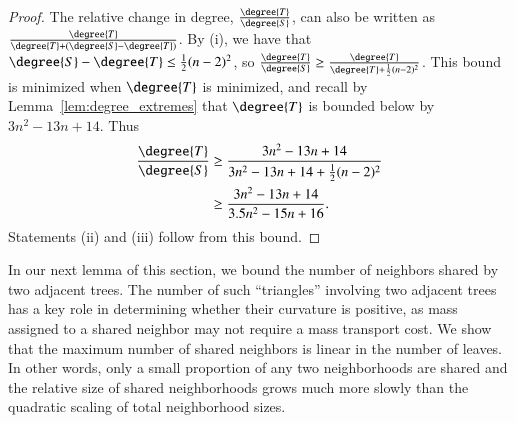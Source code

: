 \documentclass[]{elsarticle}
\begin{document}
\begin{proof}
The relative change in degree, $\frac{\degree{T}}{\degree{S}}$, can also be written as $\frac{\degree{T}}{\degree{T} + (\degree{S} - \degree{T})}$.
By (i), we have that $\degree{S} - \degree{T} \le \frac{1}{2} (n-2)^2$,
so $\frac{\degree{T}}{\degree{S}} \ge \frac{\degree{T}}{\degree{T} + \frac{1}{2} (n-2)^2} $.
This bound is minimized when $\degree{T}$ is minimized, and recall by Lemma~\ref{lem:degree_extremes} that $\degree{T}$ is bounded below by $3n^2 - 13n + 14$.
	Thus
	\begin{align*}
		\frac{\degree{T}}{\degree{S}} &\ge \frac{3n^2 - 13n + 14}{3n^2 - 13n + 14 + \frac{1}{2}(n-2)^2} \\
		&\ge \frac{3n^2 - 13n + 14}{3.5n^2 - 15n + 16}.
	\end{align*}
	Statements (ii) and (iii) follow from this bound.

\end{proof}


In our next lemma of this section, we bound the number of neighbors shared by two adjacent trees.
The number of such ``triangles'' involving two adjacent trees has a key role in determining whether their curvature is positive, as mass assigned to a shared neighbor may not require a mass transport cost.
We show that the maximum number of shared neighbors is linear in the number of leaves.
In other words, only a small proportion of any two neighborhoods are shared and the relative size of shared neighborhoods grows much more slowly than the quadratic scaling of total neighborhood sizes.
\end{document}
